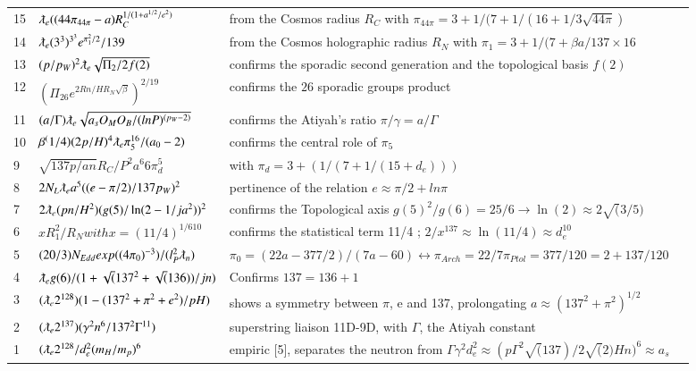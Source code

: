 \documentclass[a4paper,9pt]{article}
\begin{document}
\begin{appendix}
\begin{table}
\begin{tabular}{llll}
   15 & $\lambdabar_{e} ((44\pi_{44\pi} -a) R_C^{1/(1+ a^{1/2} /e^2)}$ & from the Cosmos radius $R_C$ with $\pi_{44\pi} = 3+1/(7 + 1/(16 + 1/3\sqrt{44\pi})$  \\ 
        
     14 & $ \lambdabar_{e} (3^3)^{3^3} e^{\pi_1^2/2}/139  $ & from the Cosmos holographic radius $R_N$ with $\pi_1 = 3+1/(7 + \beta a/137\times 16$  \\
     13 & $ (p/p_W)^2 \lambdabar_{e} \sqrt{\Pi_2/2f(2)}  $ & confirms the sporadic second generation and the topological basis $f(2)$ \\
     12 & $  (   \Pi_{26}e^   {2Rn/HR_N\sqrt{\beta}   }     )^{2/19}  $ & confirms the $26$ sporadic groups product  \\       
     11 & $ (a/\Gamma) \lambdabar_{e} \sqrt{a_s O_M O_B/(lnP)^{(p_W-2)}}  $ & confirms the Atiyah's ratio $\pi/\gamma = a/\Gamma$  \\    
     10 & $ \beta ^(1/4) (2p/H)^4 \lambdabar_{e} \pi_5^{16}/(a_0 - 2) $   & confirms the central role of $\pi_5$ \\
    
      9 & $ \sqrt{137p/an} R_C/P^2 a^6 6\pi_d^5 $   & with $\pi_d = 3 + (1/(7+1/(15 + d_e)))$  \\           
      8 & $2 N_L\lambdabar_{e} a^5((e-\pi/2)/137p_W)^2$   & pertinence of the relation $e \approx \pi/2 + ln\pi$  \\       
      7 & $2\lambdabar_{e} (pn/H^{2})(g(5)/\ln(2-1/ja^2))^2$   & confirms the Topological axis $g(5)^2/g(6) = 25/6 \rightarrow \ln(2) \approx 2\sqrt(3/5)$  \\    
      6 & $xR_1^2/R_N with x = (11/4)^{1/610}$ &  confirms the statistical term 11/4 ; $2/x^{137} \approx \ln(11/4) \approx d_e^{10}$ \\    
      5 & $(20/3)N_{Edd} exp((4 \pi_0)^{-3})/(l_P^2\lambdabar_n)$ & $\pi_0 =  (22a - 377/2)/(7a - 60) \leftrightarrow \pi_{Arch} = 22/7  \pi_{Ptol} = 377/120 = 2 + 137/120$  \\    
      4 & $\lambdabar_{e} g(6)/(1+\sqrt(137^2+\sqrt(136))/jn)$  & Confirms $137=136+1$ \\
      3 & $(\lambdabar_{e} 2^{128})(1-(137^2+\pi^2+e^2)/pH)$ & shows a symmetry between $\pi$, e and 137, prolongating $ a \approx (137^2 + \pi^2)^{1/2}$ \\
      2 & $(\lambdabar_{e} 2^{137})(\gamma^2 n^6 / 137^2 \Gamma^{11})$ & superstring liaison 11D-9D, with $\Gamma$, the Atiyah constant \\
      1 & $(\lambdabar_{e} 2^{128}/d_e^2(m_H/m_p)^6$  & empiric [5], separates the neutron from $\Gamma \gamma^2 d_e^2 \approx (p\Gamma^2 \sqrt(137)/2 \sqrt(2) Hn)^6 \approx a_s$ \\
    

\end{tabular}
\end{table}
\end{appendix}
\end{document}

